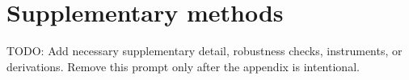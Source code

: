\section{Supplementary methods}

TODO: Add necessary supplementary detail, robustness checks, instruments, or
derivations. Remove this prompt only after the appendix is intentional.
